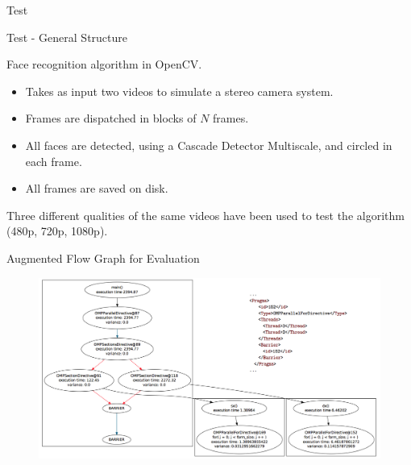 \documentclass[xcolor=dvipsnames]{beamer}
\begin{document}
\begin{section}{Test}











\begin{frame}{\hskip 0.3cm Test - General Structure}

Face recognition algorithm in OpenCV.

\begin{itemize}

\item Takes as input two videos to simulate a stereo camera system.

\item Frames are dispatched in blocks of $N$ frames.
 
\item All faces are detected, using a Cascade Detector Multiscale, and circled in each frame.

\item All frames are saved on disk.


\end{itemize}

Three different qualities of the same videos have been used to test the algorithm (480p, 720p, 1080p).


\end{frame}
















\begin{frame}{\hskip 0.3cm Augmented Flow Graph for Evaluation}

\vskip -1cm

\begin{figure}
\hskip -1cm

\includegraphics[scale=0.25]{test.png}
\end{figure}


\end{frame}
\end{section}
\end{document}
